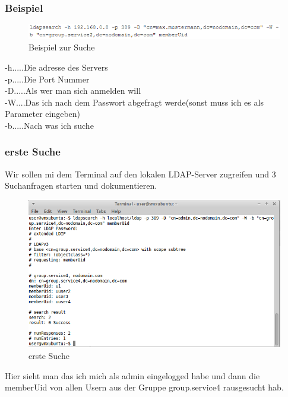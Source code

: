 \subsubsection{Beispiel}
\begin{figure}[!h]
	\begin{center}
		\includegraphics[width=1\linewidth]{images/example.png}
		\caption{Beispiel zur Suche \cite{tanenbaum2007verteilte}}
		\label{broker}
	\end{center}
\end{figure}
-h.....Die adresse des Servers\\
-p.....Die Port Nummer\\
-D.....Als wer man sich anmelden will\\
-W....Das ich nach dem Passwort abgefragt werde(sonst muss ich es als Parameter eingeben)\\
-b.....Nach was ich suche\\
\subsubsection{erste Suche}
Wir sollen mi dem Terminal auf den lokalen LDAP-Server zugreifen und 3 Suchanfragen starten und dokumentieren. 

\begin{figure}[!h]
	\begin{center}
		\includegraphics[width=0.8\linewidth]{images/1stSearch.png}
		\caption{erste Suche \cite{tanenbaum2007verteilte}}
		\label{broker}
	\end{center}
\end{figure}
Hier sieht man das ich mich als admin eingelogged habe und dann die memberUid von allen Usern aus der Gruppe group.service4 rausgesucht hab.\\
